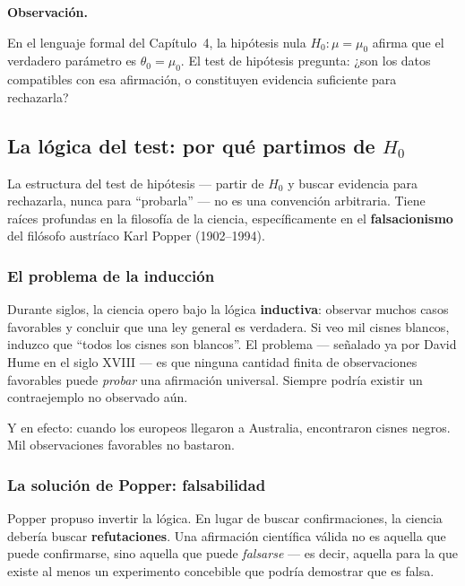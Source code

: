 \documentclass[12pt, a4paper]{book}
\newenvironment{observacion}{%
    \par\medskip\noindent\textbf{\color{azul}Observaci\'{o}n.}\enspace\itshape
}{\par\medskip}
\numberwithin{equation}{chapter}
\begin{document}
\begin{observacion}
	En el lenguaje formal del Cap\'{i}tulo~4, la
	hip\'{o}tesis nula $H_0: \mu = \mu_0$ afirma que
	el verdadero par\'{a}metro es $\theta_0 = \mu_0$.
	El test de hip\'{o}tesis pregunta: ¿son los datos
	compatibles con esa afirmaci\'{o}n, o constituyen
	evidencia suficiente para rechazarla?
\end{observacion}

\subsection{La l\'{o}gica del test: por qu\'{e} partimos
	de $H_0$}

La estructura del test de hip\'{o}tesis --- partir de
$H_0$ y buscar evidencia para rechazarla, nunca para
``probarla'' --- no es una convenci\'{o}n arbitraria.
Tiene ra\'{i}ces profundas en la filosof\'{i}a de la
ciencia, espec\'{i}ficamente en el \textbf{falsacionismo}
del fil\'{o}sofo austr\'{i}aco Karl Popper (1902--1994).

\subsubsection{El problema de la inducci\'{o}n}

Durante siglos, la ciencia opero bajo la l\'{o}gica
\textbf{inductiva}: observar muchos casos favorables
y concluir que una ley general es verdadera. Si veo
mil cisnes blancos, induzco que ``todos los cisnes son
blancos''. El problema --- se\~{n}alado ya por David
Hume en el siglo XVIII --- es que ninguna cantidad
finita de observaciones favorables puede \emph{probar}
una afirmaci\'{o}n universal. Siempre podr\'{i}a existir
un contraejemplo no observado a\'{u}n.

Y en efecto: cuando los europeos llegaron a Australia,
encontraron cisnes negros. Mil observaciones favorables
no bastaron.

\subsubsection{La soluci\'{o}n de Popper: falsabilidad}

Popper propuso invertir la l\'{o}gica. En lugar de
buscar confirmaciones, la ciencia deber\'{i}a buscar
\textbf{refutaciones}. Una afirmaci\'{o}n cient\'{i}fica
v\'{a}lida no es aquella que puede confirmarse, sino
aquella que puede \emph{falsarse} --- es decir, aquella
para la que existe al menos un experimento concebible
que podr\'{i}a demostrar que es falsa.
\end{document}
